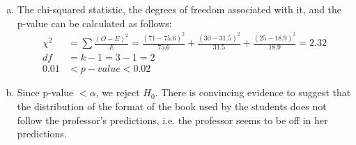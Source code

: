 {{\begin{enumerate}[(a)]
\begin{enumerate}[1.]
\begin{itemize}
\end{itemize}
Assuming random samples and with the 10\% condition is satisfied, we can assume that whether or not one student will purchase a hard copy of the book, print it our from the web or read it online is independent of another.
\item Large enough sample size: All expected counts are at least 10.
\item Format of the book used is a categorical variable.
\end{enumerate}
\item The chi-squared statistic, the degrees of freedom associated with it, and the p-value can be calculated as follows:
\begin{align*}
\chi^2 &= \sum \frac{(O - E)^2}{E} =  \frac{(71 - 75.6)^2} {75.6} + \frac{(30 - 31.5)^2} {31.5} + \frac{(25 - 18.9)^2} {18.9} = 2.32 \\
df &= k - 1 = 3 - 1 = 2 \\
0.01 &< p-value < 0.02
\end{align*}
\item Since p-value $< \alpha$, we reject $H_0$. There is convincing evidence to suggest that the distribution of the format of the book used by the students does not follow the professor's predictions, i.e. the professor seems to be off in her predictions.
\end{enumerate}
}
}

%

